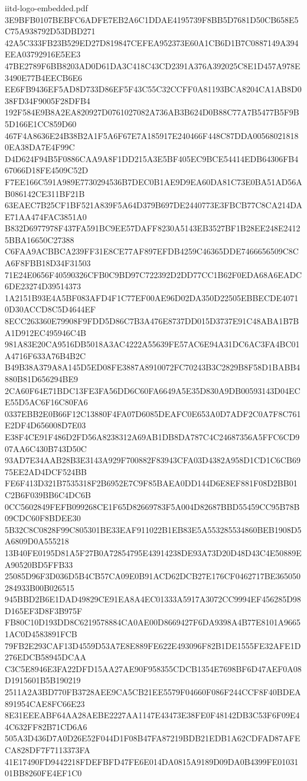 \begin{filecontents*}[overwrite]{iitd-logo-embedded.pdf}
3E9BFB0107BEBFC6ADFE7EB2A6C1DDAE4195739F8BB5D7681D50CB658E5C75A938792D53DBD271
42A5C333FB23B529ED27D819847CEFEA952373E60A1CB6D1B7C0887149A394EEA03792916E5EE3
47BE2789F6BB8203AD0D61DA3C418C43CD2391A376A392025C8E1D457A978E3490E77B4EECB6E6
EE6FB9436EF5AD8D733D86EF5F43C55C32CCFF0A81193BCA8204CA1AB8D038FD34F9005F28DFB4
192F584E9B8A2EA820927D0761027082A736AB3B624D0B88C77A7B5477B5F9B5D166E1CC859D60
467F4A8636E24B38B2A1F5A6F67E7A185917E240466F448C87DDA005680218180EA38DA7E4F99C
D4D624F94B5F0886CAA9A8F1DD215A3E5BF405EC9BCE54414EDB64306FB467066D18FE4509C52D
F7EE166C591A989E7730294536B7DEC0B1AE9D9EA60DA81C73E0BA51AD56AB086142CE311BF21B
63EAEC7B25CF1BF521A839F5A64D379B697DE2440773E3FBCB77C8CA214DAE71AA474FAC3851A0
B832D6977978F437FA591BC9EE57DAFF8230A5143EB3527BF1B28EE248E24125BBA16650C27388
C6FAA9ACBBCA239FF31E8CE77AF897EFDB4259C46365DDE7466656509C8CA6F8FBB18D34F31503
71E24E0656F40590326CFB0C9BD97C722392D2DD77CC1B62F0EDA68A6EADC6DE23274D39514373
1A2151B93E4A5BF083AFD4F1C77EF00AE96D02DA350D22505EBBECDE40710D30ACCD8C5D4644EF
8ECC263360E79908F9FDD5D86C7B3A476E8737DD015D3737E91C48ABA1B7BA1D912EC495946C4B
981A83E20CA9516DB5018A3AC4222A55639FE57AC6E94A31DC6AC3FA4BC01A4716F633A76B4B2C
B49B38A379A8A145D5ED08FE3887A8910072FC70243B3C2829B8F58D1BABB4880B81D656294BE9
2CA60F64E71BDC13FE3FA56DD6C60FA6649A5E35D830A9DB00593143D04ECE55D5AC6F16C80FA6
0337EBB2E0B66F12C13880F4FA07D6085DEAFC0E653A0D7ADF2C0A7F8C761E2DF4D656008D7E03
E38F4CE91F486D2FD56A8238312A69AB1DB8DA787C4C24687356A5FFC6CD907AA6C430B743D50C
93AD7E34AAB28B3E3143A929F700882F83943CFA03D4382A958D1CD1C6CB6975EE2AD4DCF524BB
FE6F413D321B7535318F2B6952E7C9F85BAEA0DD144D6E8EF881F08D2BB01C2B6F039BB6C4DC6B
0CC5602849FEFB099268CE1F65D82669783F5A004D82687BBD55459CC95B78B09CDC60F8BDEE30
5B32C8C0828F99C805301BE33EAF911022B1EB83E5A553285534860BEB1908D5A6809D0A555218
13B40FE0195D81A5F27B0A72854795E43914238DE93A73D20D48D43C4E50889EA90520BD5FFB33
25085D96F3D036D5B4CB57CA09E0B91ACD62DCB27E176CF0462717BE365050284933B00B026515
945BBD2B6E1DAD49829CE91EA8A4EC01333A5917A3072CC9994EF456285D98D165EF3D8F3B975F
FB80C10D193DD8C6219578884CA0AE00D8669427F6DA9398A4B77E8101A96651AC0D4583891FCB
79FB2E293CAF13D4559D53A7E8E889FE622E493096F82B1DE1555FE32AFE1D276EDCB58945DCAA
C3C5E8946E3FA22DFD15AA27AE90F958355CDCB1354E7698BF6D47AEF0A08D1915601B5B190219
2511A2A3BD770FB3728AEE9CA5CB21EE5579F04660F086F244CCF8F40BDEA891954CAE8FC66E23
8E31EEEABF64AA28AEBE2227AA1147E43473E38FE0F48142DB3C53F6F09E44C632FF82B71CD6A6
505A3D436D7A0D26E52F044D1F08B47FA87219BDB21EDB1A62CDFAD87AFECA828DF7F7113373FA
41E17490FD9442218FDEFBFD47FE6E014DA0815A9189D09DA0B4399FE0103101BB8260FE4EF1C0

\end{filecontents*}
